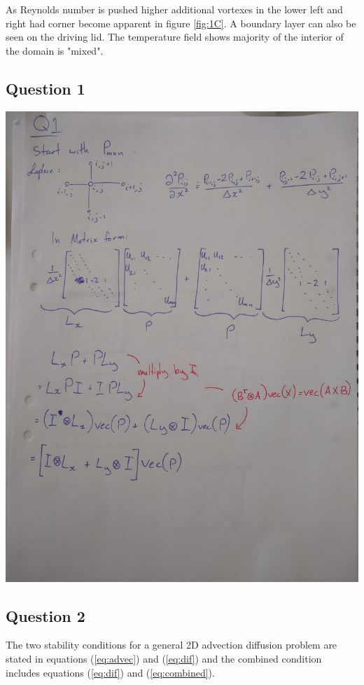 \documentclass[10pt,a4paper]{article}
\begin{document}
As Reynolds number is pushed higher additional vortexes in the lower left and right had corner become apparent in figure \ref{fig:1C}. A boundary layer can also be seen on the driving lid. The temperature field shows majority of the interior of the domain is "mixed".




\newpage
\subsection{Question 1}
\includegraphics[width=\textwidth]{Q1.jpg}

\newpage
\subsection{Question 2}
The two stability conditions for a general 2D advection diffusion problem are stated in equations (\ref{eq:advec}) and (\ref{eq:dif}) and the combined condition includes equations (\ref{eq:dif}) and (\ref{eq:combined}).
\end{document}
